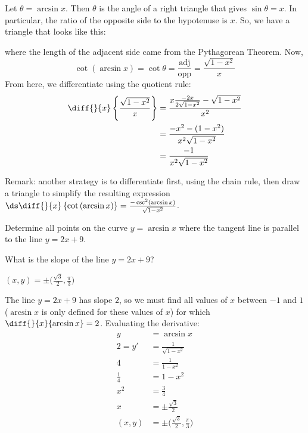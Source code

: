 \begin{solution}

Let $\theta = \arcsin x$. Then $\theta$ is the angle of a right triangle that gives $\sin \theta = x$. In particular, the ratio of the opposite side to the hypotenuse is $x$. So, we have a  triangle that looks like this:
\begin{center}\end{center}
where the length of the adjacent side came from the Pythagorean Theorem. Now,
\[\cot\left(\arcsin x\right) = \cot \theta = \frac{\mbox{adj}}{\mbox{opp}} = \frac{\sqrt{1-x^2}}{x}\]
From here, we differentiate using the quotient rule:
\begin{align*}
\diff{}{x}\left\{\frac{\sqrt{1-x^2}}{x}
\right\}&=
\frac{x\frac{-2x}{2\sqrt{1-x^2}}-\sqrt{1-x^2}}{x^2}\\
&=\frac{-x^2-(1-x^2)}{x^2\sqrt{1-x^2}}\\
&=\frac{-1}{x^2\sqrt{1-x^2}}
\end{align*}

Remark: another strategy is to differentiate first, using the chain rule, then draw a triangle to simplify the resulting expression
$\ds\diff{}{x}\left\{\cot\left(\arcsin x\right)\right\}=\frac{-\csc^2(\arcsin x)}{\sqrt{1-x^2}}$.
\end{solution}



\begin{question}[1997D]
 Determine all points on the curve $y=\arcsin x$ where the
tangent line is parallel to the line $y=2x+9$.
\end{question}
\begin{hint} What is the slope of the line $y=2x+9$?
\end{hint}
\begin{answer} $(x,y)=\pm\big(\frac{\sqrt{3}}{2},\frac{\pi}{3}\big)$
\end{answer}
\begin{solution}
The line $y=2x+9$ has slope $2$, so we must find all values
of $x$ between $-1$ and $1$ ($\arcsin  x$ is only defined for these values
of $x$) for which $\diff{}{x}\{\arcsin x\}=2$. Evaluating the derivative:
\begin{align*}
y&=\arcsin x\\
2=y'&=\frac{1}{\sqrt{1-x^2}}\\
4&=\frac{1}{1-x^2}\\
\frac{1}{4}&=1-x^2\\
x^2&=\frac{3}{4}\\
x&=\pm\frac{\sqrt{3}}{2}\\
(x,y)&=\pm\big(\frac{\sqrt{3}}{2},\frac{\pi}{3}\big)
\end{align*}
\end{solution}


